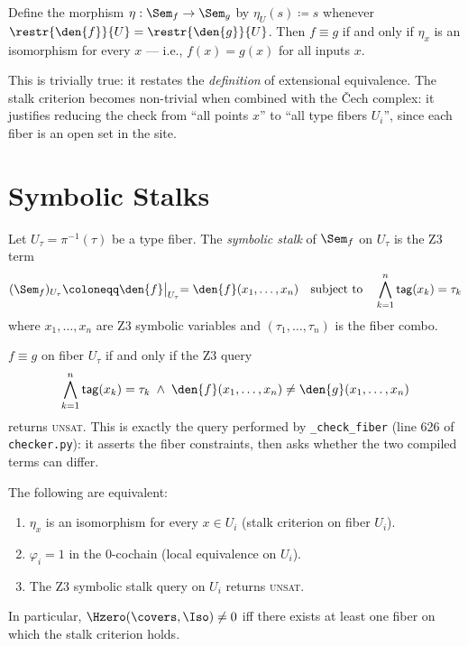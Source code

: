 \begin{corollary}
\label{cor:stalk-equiv}
Define the morphism $\eta : \Sem_f \to \Sem_g$ by
$\eta_U(s) \coloneqq s$ whenever $\restr{\den{f}}{U} = \restr{\den{g}}{U}$.
Then $f \equiv g$ if and only if $\eta_x$ is an isomorphism for
every $x$ --- i.e., $f(x) = g(x)$ for all inputs $x$.
\end{corollary}

\begin{remark}
This is trivially true: it restates the \emph{definition} of
extensional equivalence.  The stalk criterion becomes non-trivial
when combined with the \v{C}ech complex: it justifies reducing the
check from ``all points $x$'' to ``all type fibers $U_i$'', since
each fiber is an open set in the site.
\end{remark}

\section{Symbolic Stalks}

\begin{definition}
\label{def:symbolic-stalk}
Let $U_\tau = \pi^{-1}(\tau)$ be a type fiber.  The \emph{symbolic
stalk} of $\Sem_f$ on $U_\tau$ is the Z3 term
\[
  (\Sem_f)_{U_\tau} \coloneqq \den{f}\bigl|_{U_\tau}
  = \den{f}(x_1, \ldots, x_n)
  \quad\text{subject to}\quad
  \bigwedge_{k=1}^{n} \mathsf{tag}(x_k) = \tau_k
\]
where $x_1, \ldots, x_n$ are Z3 symbolic variables and
$(\tau_1, \ldots, \tau_n)$ is the fiber combo.
\end{definition}

\begin{proposition}
\label{prop:symbolic-stalk}
$f \equiv g$ on fiber $U_\tau$ if and only if the Z3 query
\[
  \bigwedge_{k=1}^{n} \mathsf{tag}(x_k) = \tau_k
  \;\wedge\;
  \den{f}(x_1, \ldots, x_n) \neq \den{g}(x_1, \ldots, x_n)
\]
returns \textsc{unsat}.  This is exactly the query performed by
\texttt{\_check\_fiber} (line 626 of \texttt{checker.py}):
it asserts the fiber constraints, then asks whether the two
compiled terms can differ.
\end{proposition}

\begin{theorem}
\label{thm:stalk-h0}
The following are equivalent:
\begin{enumerate}
  \item $\eta_x$ is an isomorphism for every $x \in U_i$ (stalk
    criterion on fiber $U_i$).
  \item $\varphi_i = 1$ in the 0-cochain (local equivalence on $U_i$).
  \item The Z3 symbolic stalk query on $U_i$ returns \textsc{unsat}.
\end{enumerate}
In particular, $\Hzero(\covers, \Iso) \neq 0$ iff there exists at
least one fiber on which the stalk criterion holds.
\end{theorem}


